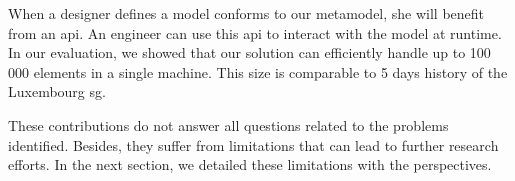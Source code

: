 When a designer defines a \gls{model} conforms to our \gls{metamodel}, she will benefit from an \gls{api}.
An engineer can use this \gls{api} to interact with the \gls{model} at runtime.
In our evaluation, we showed that our solution can efficiently handle up to 100\,000 elements in a single machine. 
This size is comparable to 5 days history of the Luxembourg \gls{sg}.

These contributions do not answer all questions related to the problems identified.
Besides, they suffer from limitations that can lead to further research efforts.
In the next section, we detailed these limitations with the perspectives.
